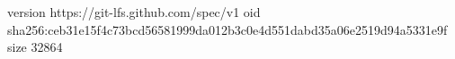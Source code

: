 version https://git-lfs.github.com/spec/v1
oid sha256:ceb31e15f4c73bcd56581999da012b3c0e4d551dabd35a06e2519d94a5331e9f
size 32864
